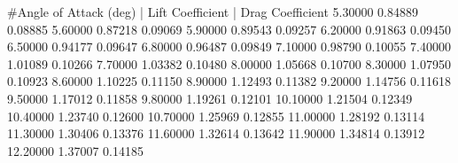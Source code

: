 #Angle of Attack (deg) | Lift Coefficient | Drag Coefficient
     5.30000            0.84889       0.08885
     5.60000            0.87218       0.09069
     5.90000            0.89543       0.09257
     6.20000            0.91863       0.09450
     6.50000            0.94177       0.09647
     6.80000            0.96487       0.09849
     7.10000            0.98790       0.10055
     7.40000            1.01089       0.10266
     7.70000            1.03382       0.10480
     8.00000            1.05668       0.10700
     8.30000            1.07950       0.10923
     8.60000            1.10225       0.11150
     8.90000            1.12493       0.11382
     9.20000            1.14756       0.11618
     9.50000            1.17012       0.11858
     9.80000            1.19261       0.12101
    10.10000            1.21504       0.12349
    10.40000            1.23740       0.12600
    10.70000            1.25969       0.12855
    11.00000            1.28192       0.13114
    11.30000            1.30406       0.13376
    11.60000            1.32614       0.13642
    11.90000            1.34814       0.13912
    12.20000            1.37007       0.14185
